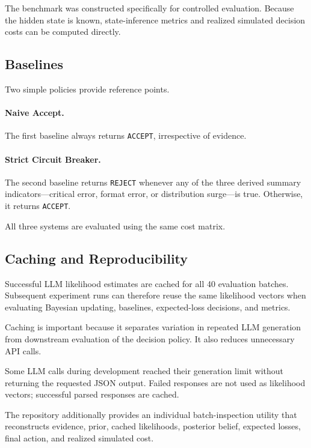 \documentclass{article}
\begin{document}
The benchmark was constructed specifically for controlled evaluation. Because the hidden state is known, state-inference metrics and realized simulated decision costs can be computed directly.


\subsection{Baselines}

Two simple policies provide reference points.

\paragraph{Naive Accept.}
The first baseline always returns \texttt{ACCEPT}, irrespective of evidence.

\paragraph{Strict Circuit Breaker.}
The second baseline returns \texttt{REJECT} whenever any of the three derived summary indicators---critical error, format error, or distribution surge---is true. Otherwise, it returns \texttt{ACCEPT}.

All three systems are evaluated using the same cost matrix.


\subsection{Caching and Reproducibility}

Successful LLM likelihood estimates are cached for all 40 evaluation batches. Subsequent experiment runs can therefore reuse the same likelihood vectors when evaluating Bayesian updating, baselines, expected-loss decisions, and metrics.

Caching is important because it separates variation in repeated LLM generation from downstream evaluation of the decision policy. It also reduces unnecessary API calls.

Some LLM calls during development reached their generation limit without returning the requested JSON output. Failed responses are not used as likelihood vectors; successful parsed responses are cached.

The repository additionally provides an individual batch-inspection utility that reconstructs evidence, prior, cached likelihoods, posterior belief, expected losses, final action, and realized simulated cost.
\end{document}
